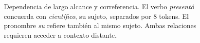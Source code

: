 \begin{figure}[H]
\caption{Dependencia de largo alcance y correferencia. El verbo
\textit{present\'o} concuerda con \textit{cient\'ifico}, su sujeto,
separados por 8 tokens. El pronombre \textit{su} refiere tambi\'en al mismo
sujeto. Ambas relaciones requieren acceder a contexto distante.}
\label{fig:dependencias}
\end{figure}
